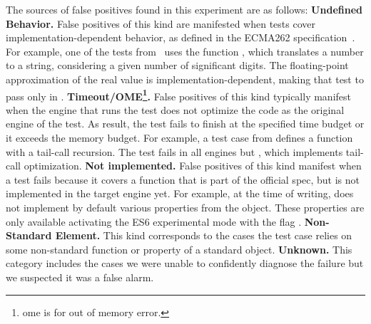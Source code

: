 \documentclass[10pt,conference,anonymous]{IEEEtran}
\begin{document}
The sources of false positives found in this experiment are as
follows: \textbf{Undefined Behavior.} False positives of this kind are
manifested when tests cover implementation-dependent behavior, as
defined in the ECMA262 specification~\cite{ecmas262-spec}. For
example, one of the tests from \jerry\ uses the function
, which translates a number to
a string, considering a given number of significant digits. The
floating-point approximation of the real value is
implementation-dependent, making that test to pass only in
\chakra. \textbf{Timeout/OME\footnote{ome is for out of memory
    error.}.} False positives of this kind typically manifest when the
engine that runs the test does not optimize the code as the original
engine of the test. As result, the test fails to finish at the
specified time budget or it exceeds the memory budget. For example, a
test case from \jsc{} defines a function with a tail-call
recursion. The test fails in all engines but \jsc{}, which implements
tail-call optimization. \textbf{Not implemented.} False positives of
this kind manifest when a test fails because it covers a function that
is part of the official spec, but is not implemented in the target
engine yet. For example, at the time of writing, \chakra{} does not
implement by default various properties from the 
object. These properties are only available activating the ES6
experimental mode with the flag . 
\textbf{Non-Standard Element.} This kind corresponds to the cases the
test case relies on some non-standard function or property of a
standard object. 
  \textbf{Unknown.} This category includes the
cases we were unable to confidently diagnose the failure but we
suspected it was a false alarm.

\end{document}
